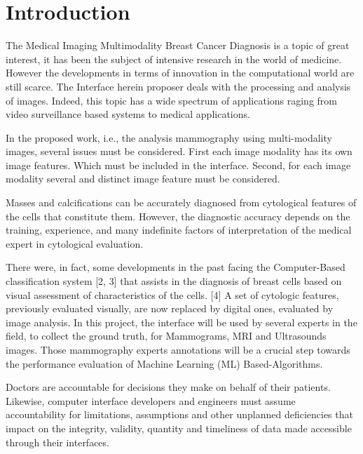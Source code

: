 
\chapter{Introduction}
\label{chapter:introduction}

The Medical Imaging Multimodality Breast Cancer Diagnosis is a topic of great interest, it has been the subject of intensive research in the world of medicine. However the developments in terms of innovation in the computational world are still scarce. The Interface herein proposer deals with the processing and analysis of images. Indeed, this topic has a wide spectrum of applications raging from video surveillance based systems to medical applications.

In the proposed work, i.e., the analysis mammography using multi-modality images, several issues must be considered. First each image modality has its own image features. Which must be included in the interface. Second, for each image modality several and distinct image feature must be considered.

Masses and calcifications can be accurately diagnosed from cytological features \cite{Mangasarian95breastcancer} of the cells that constitute them. However, the diagnostic accuracy depends on the training, experience, and many indefinite factors of interpretation of the medical expert in cytological evaluation.

There were, in fact, some developments in the past facing the Computer-Based classification system [2, 3] that assists in the diagnosis of breast cells based on visual assessment of characteristics of the cells. [4] A set of cytologic features, previously evaluated visually, are now replaced by digital ones, evaluated by image analysis. In this project, the interface will be used by several experts in the field, to collect the ground truth, for Mammograms, MRI and Ultrasounds images. Those mammography experts annotations will be a crucial step towards the performance evaluation of Machine Learning (ML) Based-Algorithms.

Doctors are accountable for decisions they make on behalf of their patients. Likewise, computer interface developers and engineers must assume accountability for limitations, assumptions and other unplanned deficiencies that impact on the integrity, validity, quantity and timeliness of data made accessible through their interfaces.

